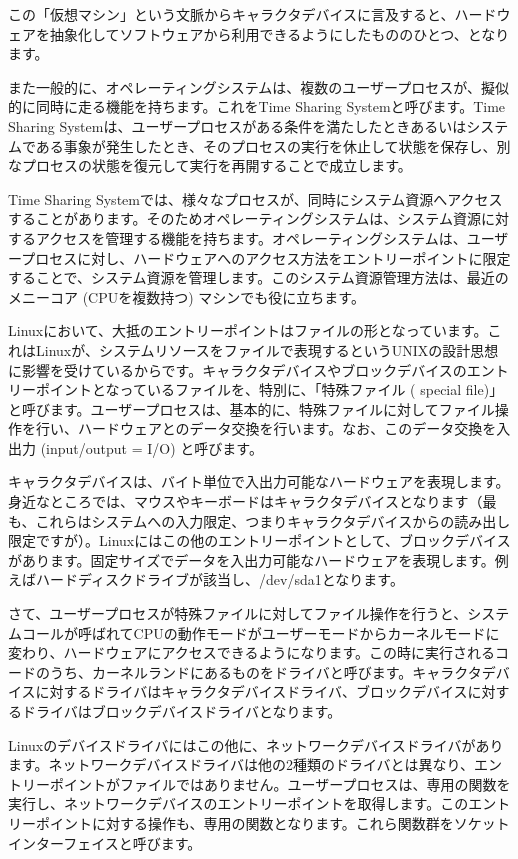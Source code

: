 \documentclass[mingoth,a4paper]{jsarticle}
\begin{document}
この「仮想マシン」という文脈からキャラクタデバイスに言及すると、ハードウェアを抽象化してソフトウェアから利用できるようにしたもののひとつ、となります。

また一般的に、オペレーティングシステムは、複数のユーザープロセスが、擬似的に同時に走る機能を持ちます。これをTime Sharing Systemと呼びます。Time Sharing Systemは、ユーザープロセスがある条件を満たしたときあるいはシステムである事象が発生したとき、そのプロセスの実行を休止して状態を保存し、別なプロセスの状態を復元して実行を再開することで成立します。

Time Sharing Systemでは、様々なプロセスが、同時にシステム資源へアクセスすることがあります。そのためオペレーティングシステムは、システム資源に対するアクセスを管理する機能を持ちます。オペレーティングシステムは、ユーザープロセスに対し、ハードウェアへのアクセス方法をエントリーポイントに限定することで、システム資源を管理します。このシステム資源管理方法は、最近のメニーコア (CPUを複数持つ) マシンでも役に立ちます。

Linuxにおいて、大抵のエントリーポイントはファイルの形となっています。これはLinuxが、システムリソースをファイルで表現するというUNIXの設計思想に影響を受けているからです。キャラクタデバイスやブロックデバイスのエントリーポイントとなっているファイルを、特別に、「特殊ファイル ( special file)」と呼びます。ユーザープロセスは、基本的に、特殊ファイルに対してファイル操作を行い、ハードウェアとのデータ交換を行います。なお、このデータ交換を入出力 (input/output = I/O) と呼びます。

キャラクタデバイスは、バイト単位で入出力可能なハードウェアを表現します。身近なところでは、マウスやキーボードはキャラクタデバイスとなります（最も、これらはシステムへの入力限定、つまりキャラクタデバイスからの読み出し限定ですが）。Linuxにはこの他のエントリーポイントとして、ブロックデバイスがあります。固定サイズでデータを入出力可能なハードウェアを表現します。例えばハードディスクドライブが該当し、/dev/sda1となります。

さて、ユーザープロセスが特殊ファイルに対してファイル操作を行うと、システムコールが呼ばれてCPUの動作モードがユーザーモードからカーネルモードに変わり、ハードウェアにアクセスできるようになります。この時に実行されるコードのうち、カーネルランドにあるものをドライバと呼びます。キャラクタデバイスに対するドライバはキャラクタデバイスドライバ、ブロックデバイスに対するドライバはブロックデバイスドライバとなります。

Linuxのデバイスドライバにはこの他に、ネットワークデバイスドライバがあります。ネットワークデバイスドライバは他の2種類のドライバとは異なり、エントリーポイントがファイルではありません。ユーザープロセスは、専用の関数を実行し、ネットワークデバイスのエントリーポイントを取得します。このエントリーポイントに対する操作も、専用の関数となります。これら関数群をソケットインターフェイスと呼びます。
\end{document}
